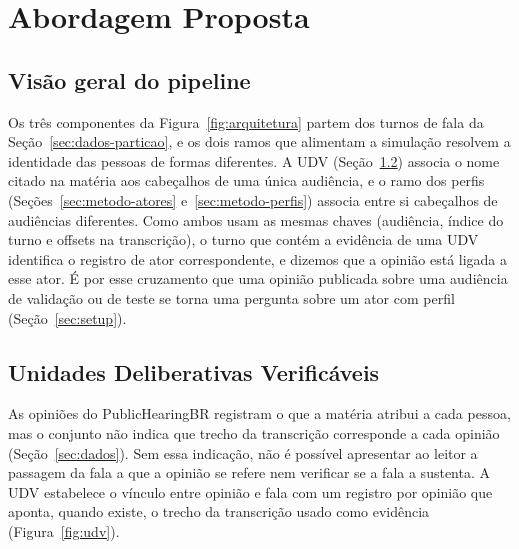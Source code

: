 \section{Abordagem Proposta}
\label{sec:metodo}

\subsection{Visão geral do pipeline}
\label{sec:metodo-visao}



Os três componentes da Figura~\ref{fig:arquitetura} partem dos turnos de fala da
Seção~\ref{sec:dados-particao}, e os dois ramos que alimentam a simulação resolvem a identidade das
pessoas de formas diferentes. A UDV (Seção~\ref{sec:metodo-udv}) associa o nome citado na matéria aos
cabeçalhos de uma única audiência, e o ramo dos perfis (Seções~\ref{sec:metodo-atores}
e~\ref{sec:metodo-perfis}) associa entre si cabeçalhos de audiências diferentes. Como ambos usam as
mesmas chaves (audiência, índice do turno e offsets na transcrição), o turno que contém a evidência de
uma UDV identifica o registro de ator correspondente, e dizemos que a opinião está ligada a esse ator.
É por esse cruzamento que uma opinião publicada sobre uma audiência de validação ou de teste se torna
uma pergunta sobre um ator com perfil (Seção~\ref{sec:setup}).

\subsection{Unidades Deliberativas Verificáveis}
\label{sec:metodo-udv}

As opiniões do PublicHearingBR registram o que a matéria atribui a cada pessoa, mas o conjunto não
indica que trecho da transcrição corresponde a cada opinião (Seção~\ref{sec:dados}). Sem essa
indicação, não é possível apresentar ao leitor a passagem da fala a que a opinião se refere nem
verificar se a fala a sustenta. A UDV estabelece o vínculo entre opinião e fala com um registro por
opinião que aponta, quando existe, o trecho da transcrição usado como evidência
(Figura~\ref{fig:udv}).

